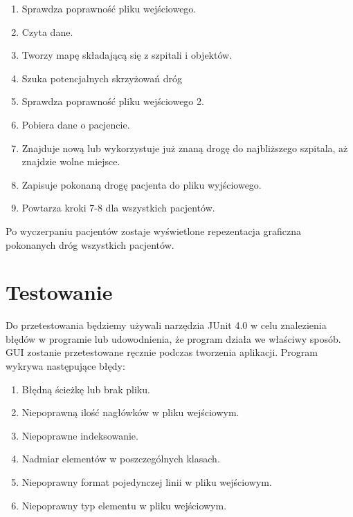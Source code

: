 ﻿\documentclass{article}
\begin{document}
\begin{enumerate}
\item Sprawdza poprawno\'{s}\'{c} pliku wej\'{s}ciowego.
\item Czyta dane.
\item Tworzy map\k{e} sk{\l}adaj\k{a}c\k{a} si\k{e} z szpitali i objekt\'{o}w.
\item Szuka potencjalnych skrzy\.{z}owa\'{n} dr\'{o}g
\item Sprawdza poprawno\'{s}\'{c} pliku wej\'{s}ciowego 2.
\item Pobiera dane o pacjencie.
\item Znajduje now\k{a} lub wykorzystuje ju\.{z} znan\k{a} drog\k{e} do najbli\.{z}szego szpitala, a\.{z} znajdzie wolne miejsce.
\item Zapisuje pokonan\k{a} drog\k{e} pacjenta do pliku wyj\'{s}ciowego.
\item Powtarza kroki 7-8 dla wszystkich pacjent\'{o}w.
\end{enumerate}

\noindent Po wyczerpaniu pacjent\'{o}w zostaje wy\'{s}wietlone repezentacja graficzna pokonanych dr\'{o}g wszystkich pacjent\'{o}w.

\noindent 
\section{Testowanie}

\noindent Do przetestowania b\k{e}dziemy u\.{z}ywali narz\k{e}dzia JUnit 4.0 w celu znalezienia b{\l}\k{e}d\'{o}w w programie lub udowodnienia, \.{z}e program dzia{\l}a we w{\l}a\'{s}ciwy spos\'{o}b. GUI zostanie przetestowane r\k{e}cznie podczas tworzenia aplikacji. Program wykrywa nast\k{e}puj\k{a}ce b{\l}\k{e}dy:

\begin{enumerate}
\item  B{\l}\k{e}dn\k{a} \'{s}cie\.{z}k\k{e} lub brak pliku. 

\item  Niepoprawn\k{a} ilo\'{s}\'{c} nag{\l}\'{o}wk\'{o}w w pliku wej\'{s}ciowym.

\item  Niepoprawne indeksowanie.

\item  Nadmiar element\'{o}w w poszczeg\'{o}lnych klasach.

\item  Niepoprawny format pojedynczej linii w pliku wej\'{s}ciowym.

\item  Niepoprawny typ elementu w pliku wej\'{s}ciowym.
\end{enumerate}
\end{document}
